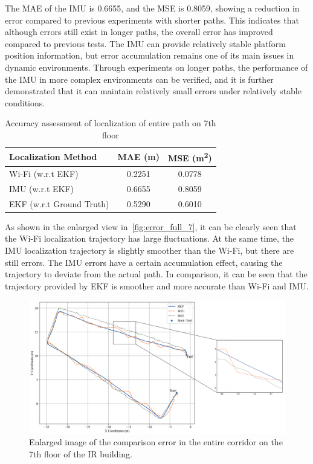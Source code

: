\documentclass[12pt,a4paper]{article}
\numberwithin{equation}{section}
\begin{document}
The MAE of the IMU is 0.6655, and the MSE is 0.8059, showing a reduction in
error compared to previous experiments with shorter paths. This indicates that
although errors still exist in longer paths, the overall error has improved
compared to previous tests. The IMU can provide relatively stable platform
position information, but error accumulation remains one of its main issues in
dynamic environments. Through experiments on longer paths, the performance of
the IMU in more complex environments can be verified, and it is further
demonstrated that it can maintain relatively small errors under relatively
stable conditions.
\begin{table}[H]
  \centering
  \caption{Accuracy assessment of localization of entire path on 7th floor}
  \label{tab:localization_error}
  \begin{tabular}{lcc}
    \toprule
    \textbf{Localization Method} & \textbf{MAE (m)} & \textbf{MSE (m\textsuperscript{2})} \\
    \midrule
    Wi-Fi (w.r.t EKF) & 0.2251 & 0.0778 \\
    IMU (w.r.t EKF)   & 0.6655 & 0.8059 \\
    EKF (w.r.t Ground Truth)    & 0.5290 & 0.6010 \\
    \bottomrule
  \end{tabular}
\end{table}

As shown in the enlarged view in~\autoref{fig:error_full_7}, it can be clearly
seen that the Wi-Fi localization trajectory has large fluctuations. At the same
time, the IMU localization trajectory is slightly smoother than the Wi-Fi, but
there are still errors. The IMU errors have a certain accumulation effect,
causing the trajectory to deviate from the actual path. In comparison, it can be
seen that the trajectory provided by EKF is smoother and more accurate than
Wi-Fi and IMU.
\begin{figure}[H]
  \centering
  \includegraphics[width=1\linewidth]{Amplification images/wifi/full_circle.png}
  \caption{Enlarged image of the comparison error in the entire corridor on the
    7th floor of the IR building.}
  \label{fig:error_full_7}
\end{figure}
\end{document}
